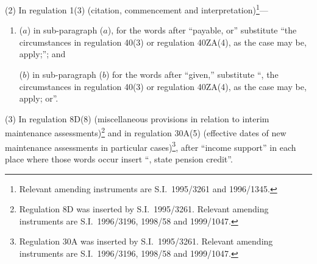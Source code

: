 \documentclass[12pt,a4paper]{article}
\begin{document}
(2) In regulation 1(3) (citation, commencement and interpretation)\footnote{Relevant amending instruments are S.I.\ 1995/3261 and 1996/1345.}—
\begin{enumerate}\item[]
($a$) in sub-paragraph ($a$), for the words after “payable, or” substitute “the circumstances in regulation 40(3) or regulation 40ZA(4), as the case may be, apply;”; and

($b$) in sub-paragraph ($b$)  for the words after “given,” substitute “, the circumstances in regulation 40(3) or regulation 40ZA(4), as the case may be, apply; or”.
\end{enumerate}

(3) In regulation 8D(8) (miscellaneous provisions in relation to interim maintenance assessments)\footnote{Regulation 8D was inserted by S.I.\ 1995/3261. Relevant amending instruments are S.I.\ 1996/3196, 1998/58 and 1999/1047.} and in regulation 30A(5) (effective dates of new maintenance assessments in particular cases)\footnote{Regulation 30A was inserted by S.I.\ 1995/3261. Relevant amending instruments are S.I.\ 1996/3196, 1998/58 and 1999/1047.}, after “income support” in each place where those words occur insert “, state pension credit”.
\end{document}
